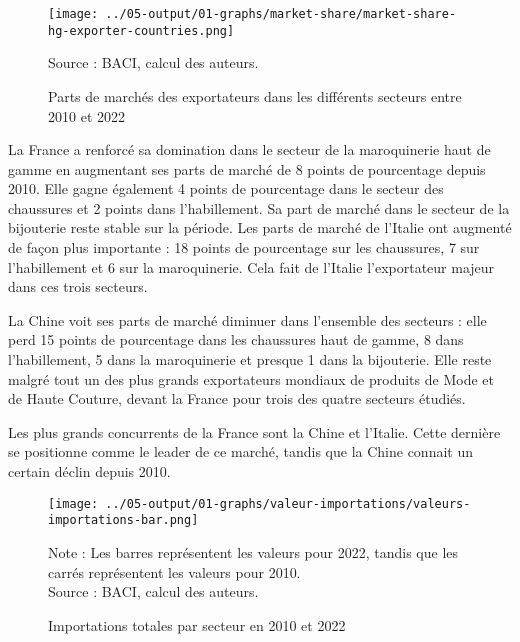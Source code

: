 \documentclass[french,10pt,a4paper]{article}
\begin{document}
\begin{figure}[!h]
  \centering
  \texttt{[image: ../05-output/01-graphs/market-share/market-share-hg-exporter-countries.png]}
  \captionsetup{justification=raggedright,singlelinecheck=false, font=small}
  \caption*{Source : BACI, calcul des auteurs.}
  \captionsetup{justification=centering, singlelinecheck=true, font=normalsize}
  \caption{Parts de marchés des exportateurs dans les différents secteurs entre 2010 et 2022}
  \label{fig:market-share}
\end{figure}

\bigskip

La France a renforcé sa domination dans le secteur de la maroquinerie haut de gamme en augmentant ses parts de marché de 8 points de pourcentage depuis 2010. Elle gagne également 4 points de pourcentage dans le secteur des chaussures et 2 points dans l'habillement. Sa part de marché dans le secteur de la bijouterie reste stable sur la période. Les parts de marché de l'Italie ont augmenté de façon plus importante : 18 points de pourcentage sur les chaussures, 7 sur l'habillement et 6 sur la maroquinerie. Cela fait de l'Italie l'exportateur majeur dans ces trois secteurs.

La Chine voit ses parts de marché diminuer dans l'ensemble des secteurs : elle perd 15 points de pourcentage dans les chaussures haut de gamme, 8 dans l'habillement, 5 dans la maroquinerie et presque 1 dans la bijouterie. Elle reste malgré tout un des plus grands exportateurs mondiaux de produits de Mode et de Haute Couture, devant la France pour trois des quatre secteurs étudiés.

Les plus grands concurrents de la France sont la Chine et l'Italie. Cette dernière se positionne comme le leader de ce marché, tandis que la Chine connait un certain déclin depuis 2010.

\bigskip

\begin{figure}[!h]
  \centering
  \texttt{[image: ../05-output/01-graphs/valeur-importations/valeurs-importations-bar.png]}
  \captionsetup{justification=raggedright,singlelinecheck=false, font=small}
  \caption*{Note : Les barres représentent les valeurs pour 2022, tandis que les carrés représentent les valeurs pour 2010. \\
  Source : BACI, calcul des auteurs.}
  \captionsetup{justification=centering, singlelinecheck=true, font=normalsize}
  \caption{Importations totales par secteur en 2010 et 2022}
  \label{fig:valeurs-importations}
\end{figure}
\end{document}
